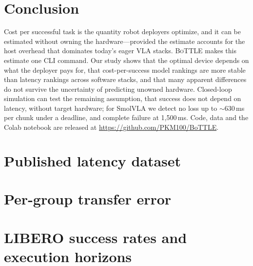 \documentclass[10pt]{article}
\newcommand{\bottle}{\textsc{BoTTLE}}
\begin{document}
\section{Conclusion}
Cost per successful task is the quantity robot deployers optimize, and it can be estimated without
owning the hardware---provided the estimate accounts for the host overhead that dominates today's
eager VLA stacks. \bottle{} makes this estimate one CLI command. Our study shows that the
optimal device depends on what the deployer pays for, that cost-per-success model rankings are more
stable than latency rankings across software stacks, and that many apparent differences do not
survive the uncertainty of predicting unowned hardware. Closed-loop simulation can test the
remaining assumption, that success does not depend on latency, without target hardware; for
SmolVLA we detect no loss up to ${\sim}630$\,ms per chunk under a deadline, and complete
failure at 1{,}500\,ms. Code, data and
the Colab notebook are released at \url{https://github.com/PKM100/BoTTLE}.




\appendix
\section{Published latency dataset}\label{app:data}


\section{Per-group transfer error}
\begin{table}[h]\centering\small

\caption{E2 MAPE (\%) per source group. Same: reference latency reused; Spec: spec-only roofline;
Global: single-factor calibration; Additive: constant residual; Ours: overhead-aware.}\label{tab:groups}
\end{table}

\section{LIBERO success rates and execution horizons}
\begin{table}[h]\centering

\caption{Per-suite LIBERO success rates (\%) and execution horizon $H$ used in E3. Trials: episodes per
suite in the source evaluation. $^\ddagger$: not documented; swept over $\{5,10,25,50\}$ in the Monte
Carlo.}\label{tab:success}
\end{table}
\end{document}
